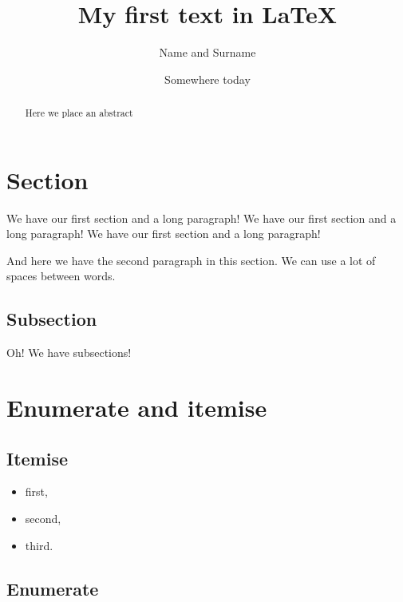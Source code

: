 \documentclass{article}
\begin{document}


\author{Name and Surname}   %
\title{My first text in LaTeX}  %
\date{Somewhere today}     %
\maketitle{}     %
\begin{abstract}
  Here we place an abstract
\end{abstract}

\tableofcontents %

\section{Section}
We have our first section and a long paragraph!
We have our first section and a long paragraph!
We have our first section and a long paragraph!

And here we have the second paragraph %
in this section. We can use a lot of spaces   between
words.

\subsection{Subsection}
Oh! We have subsections!

\section{Enumerate and itemise}
\subsection{Itemise}

\begin{itemize}
\item first,
\item second,
\item third.
\end{itemize}

\subsection{Enumerate}
\end{document}
